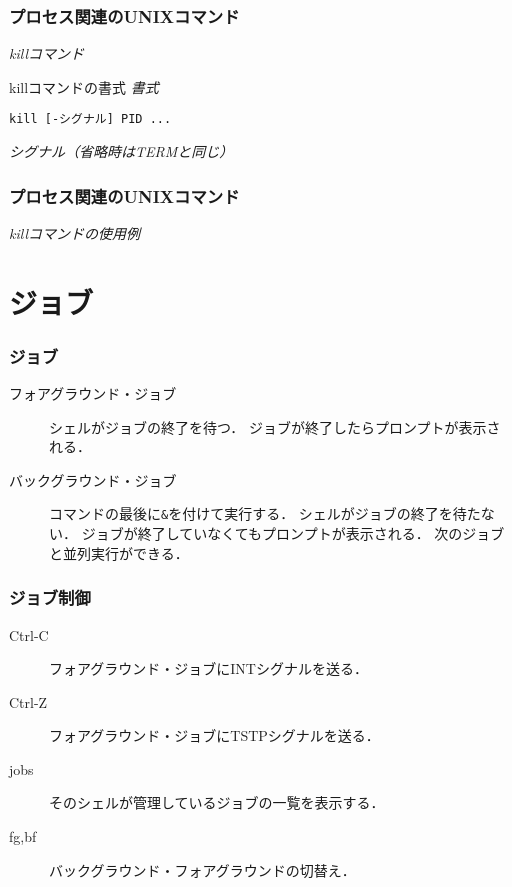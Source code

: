 \documentclass{beamer}                 %
\begin{document}
\begin{frame}[fragile]
  \frametitle{プロセス関連のUNIXコマンド}
  \emph{killコマンド}
  \begin{itembox}[l]{killコマンドの書式}
    \emph{書式}
    \begin{lstlisting}[frame=none]
    kill [-シグナル] PID ...
    \end{lstlisting}
    \emph{シグナル（省略時はTERMと同じ）}
  \end{itembox}
\end{frame}

\begin{frame}[fragile]
  \frametitle{プロセス関連のUNIXコマンド}
  \emph{killコマンドの使用例}
\end{frame}

\section{ジョブ}
\begin{frame}[fragile]
  \frametitle{ジョブ}
  \begin{description}
  \item[フォアグラウンド・ジョブ]
    シェルがジョブの終了を待つ．
    ジョブが終了したらプロンプトが表示される．

  \item[バックグラウンド・ジョブ]
    コマンドの最後に\texttt{\&}を付けて実行する．
    シェルがジョブの終了を待たない．
    ジョブが終了していなくてもプロンプトが表示される．
    次のジョブと並列実行ができる．
  \end{description}
\end{frame}

\begin{frame}[fragile]
  \frametitle{ジョブ制御}
  \begin{description}
  \item[Ctrl-C] フォアグラウンド・ジョブにINTシグナルを送る．
  \item[Ctrl-Z] フォアグラウンド・ジョブにTSTPシグナルを送る．
  \item[jobs] そのシェルが管理しているジョブの一覧を表示する．
  \item[fg,bf] バックグラウンド・フォアグラウンドの切替え．
  \end{description}
\end{frame}
\end{document}
